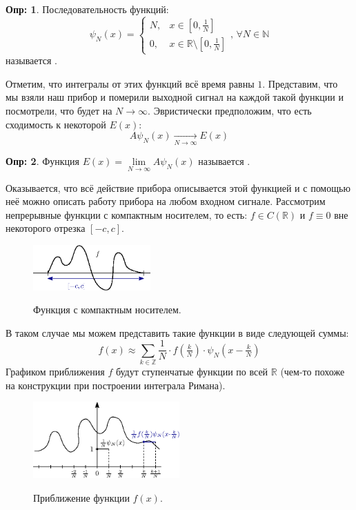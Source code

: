 \documentclass[12pt]{article}
\newcommand{\MR}{\mathbb{R}}
\newcommand{\MN}{\mathbb{N}}
\newcommand{\MZ}{\mathbb{Z}}
\theoremstyle{definition}
\newtheorem{defn}{Опр:}
\newcommand{\ddsum}[2]{\displaystyle\sum\limits_{#1}^{#2}}
\begin{document}
\begin{defn}
	Последовательность функций: 
	$$
		\psi_N(x) = \left\{
		\begin{array}{ll}
			N,& x \in \left[0,\frac{1}{N}\right]\\[4pt]
			0, & x \in \MR \setminus \left[0,\frac{1}{N}\right]
		\end{array}
		\right., \, \forall N \in \MN 
	$$ 
	называется .
\end{defn}
Отметим, что интегралы от этих функций всё время равны $1$. Представим, что мы взяли наш прибор и померили выходной сигнал на каждой такой функции и посмотрели, что будет на $N \to \infty$. Эвристически предположим, что есть сходимость к некоторой $E(x)$:
$$
	A \psi_N(x) \xrightarrow[N \to \infty]{} E(x)
$$
\begin{defn}
	Функция $E(x) = \lim\limits_{N \to \infty}A \psi_N(x)$ называется .
\end{defn}
Оказывается, что всё действие прибора описывается этой функцией и с помощью неё можно описать работу прибора на любом входном сигнале. Рассмотрим непрерывные функции с компактным носителем, то есть: $f \in C(\MR)$ и $f \equiv 0$ вне некоторого отрезка $[-c,c]$.
\begin{figure}[H]
	\centering
	\includegraphics[width=0.4\textwidth]{MA3L25_3.eps}
	\label{MA3L25_3}
	\caption{Функция с компактным носителем.}
	\label{fig: Функция с компактным носителем}
\end{figure}
В таком случае мы можем представить такие функции в виде следующей суммы:
$$
	f(x) \approx \ddsum{k \in \MZ}{}\dfrac{1}{N}{\cdot}f\left(\tfrac{k}{N}\right){\cdot}\psi_N\left(x - \tfrac{k}{N}\right)
$$
Графиком приближения $f$ будут ступенчатые функции по всей $\MR$ (чем-то похоже на конструкции при построении интеграла Римана).
\begin{figure}[H]
	\centering
	\includegraphics[width=0.5\textwidth]{MA3L25_4.eps}
	\label{MA3L25_4}
	\caption{Приближение функции $f(x)$.}
	\label{fig: Приближение функции $f(x)$}
\end{figure}
\end{document}
